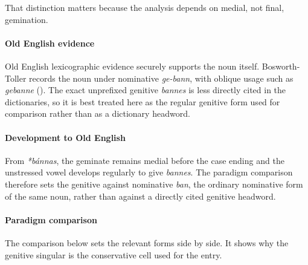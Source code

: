 \documentclass[
  british,
  a4paper,
]{article}
\begin{document}
That distinction matters because the analysis depends on medial, not
final, gemination.

\paragraph{Old English evidence}\label{old-english-evidence-39}

Old English lexicographic evidence securely supports the noun itself.
Bosworth-Toller records the noun under nominative \emph{ge-bann}, with
oblique usage such as \emph{gebanne}
(). The
exact unprefixed genitive \emph{bannes} is less directly cited in the
dictionaries, so it is best treated here as the regular genitive form
used for comparison rather than as a dictionary headword.

\paragraph{Development to Old
English}\label{development-to-old-english-39}

From \emph{*bánnas}, the geminate remains medial before the case ending
and the unstressed vowel develops regularly to give \emph{bannes}. The
paradigm comparison therefore sets the genitive against nominative
\emph{ban}, the ordinary nominative form of the same noun, rather than
against a directly cited genitive headword.

\paragraph{Paradigm comparison}\label{paradigm-comparison}

The comparison below sets the relevant forms side by side. It shows why
the genitive singular is the conservative cell used for the entry.
\end{document}
